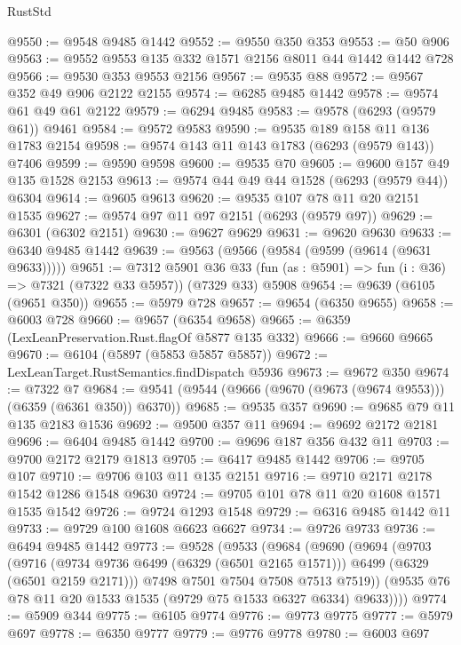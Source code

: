 \begin{lexlean}{RustStd}
\begin{coremodule}
{{@9550 := @9548 @9485 @1442
@9552 := @9550 @350 @353
@9553 := @50 @906
@9563 := @9552 @9553 @135 @332 @1571 @2156 @8011 @44 @1442 @1442 @728
@9566 := @9530 @353 @9553 @2156
@9567 := @9535 @88
@9572 := @9567 @352 @49 @906 @2122 @2155
@9574 := @6285 @9485 @1442
@9578 := @9574 @61 @49 @61 @2122
@9579 := @6294 @9485
@9583 := @9578 (@6293 (@9579 @61)) @9461
@9584 := @9572 @9583
@9590 := @9535 @189 @158 @11 @136 @1783 @2154
@9598 := @9574 @143 @11 @143 @1783 (@6293 (@9579 @143)) @7406
@9599 := @9590 @9598
@9600 := @9535 @70
@9605 := @9600 @157 @49 @135 @1528 @2153
@9613 := @9574 @44 @49 @44 @1528 (@6293 (@9579 @44)) @6304
@9614 := @9605 @9613
@9620 := @9535 @107 @78 @11 @20 @2151 @1535
@9627 := @9574 @97 @11 @97 @2151 (@6293 (@9579 @97))
@9629 := @6301 (@6302 @2151)
@9630 := @9627 @9629
@9631 := @9620 @9630
@9633 := @6340 @9485 @1442
@9639 := @9563 (@9566 (@9584 (@9599 (@9614 (@9631 @9633)))))
@9651 := @7312
    @5901
    @36
    @33
    (fun (as : @5901) => fun (i : @36) => @7321 (@7322 @33 @5957))
    (@7329 @33)
    @5908
@9654 := @9639 (@6105 (@9651 @350))
@9655 := @5979 @728
@9657 := @9654 (@6350 @9655)
@9658 := @6003 @728
@9660 := @9657 (@6354 @9658)
@9665 := @6359 (LexLeanPreservation.Rust.flagOf @5877 @135 @332)
@9666 := @9660 @9665
@9670 := @6104 (@5897 (@5853 @5857 @5857))
@9672 := LexLeanTarget.RustSemantics.findDispatch @5936
@9673 := @9672 @350
@9674 := @7322 @7
@9684 := @9541 (@9544 (@9666 (@9670 (@9673 (@9674 @9553))) (@6359 (@6361 @350)) @6370))
@9685 := @9535 @357
@9690 := @9685 @79 @11 @135 @2183 @1536
@9692 := @9500 @357 @11
@9694 := @9692 @2172 @2181
@9696 := @6404 @9485 @1442
@9700 := @9696 @187 @356 @432 @11
@9703 := @9700 @2172 @2179 @1813
@9705 := @6417 @9485 @1442
@9706 := @9705 @107
@9710 := @9706 @103 @11 @135 @2151
@9716 := @9710 @2171 @2178 @1542 @1286 @1548 @9630
@9724 := @9705 @101 @78 @11 @20 @1608 @1571 @1535 @1542
@9726 := @9724 @1293 @1548
@9729 := @6316 @9485 @1442 @11
@9733 := @9729 @100 @1608 @6623 @6627
@9734 := @9726 @9733
@9736 := @6494 @9485 @1442
@9773 := @9528
    (@9533
      (@9684
        (@9690
          (@9694
            (@9703
              (@9716
                (@9734 @9736 @6499 (@6329 (@6501 @2165 @1571)))
                @6499
                (@6329 (@6501 @2159 @2171)))
              @7498
              @7501
              @7504
              @7508
              @7513
              @7519))
          (@9535 @76 @78 @11 @20 @1533 @1535 (@9729 @75 @1533 @6327 @6334) @9633))))
@9774 := @5909 @344
@9775 := @6105 @9774
@9776 := @9773 @9775
@9777 := @5979 @697
@9778 := @6350 @9777
@9779 := @9776 @9778
@9780 := @6003 @697
}}
\end{coremodule}
\end{lexlean}
